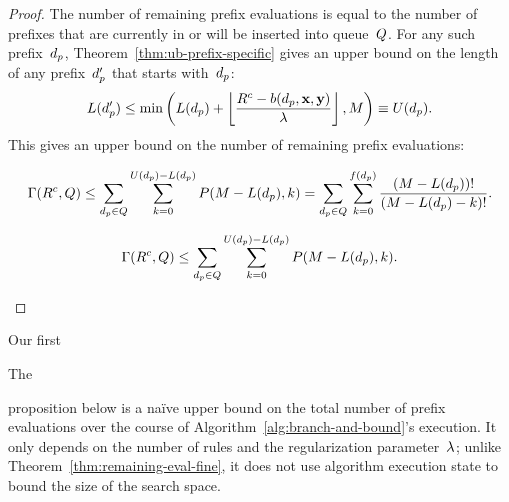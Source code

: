 \begin{proof}
The number of remaining prefix evaluations is equal to the number of
prefixes that are currently in or will be inserted into queue~$Q$.
%
For any such prefix~$d_p$, Theorem~\ref{thm:ub-prefix-specific}
gives an upper bound on the length of any prefix~$d_p'$
that starts with~$d_p$:
\begin{align}
L(d_p') \le \min \left( L(d_p) + \left\lfloor \frac{{R^c} - b(d_p, \mathbf{x}, \mathbf{y})}{{\lambda}} \right\rfloor, M \right)
\equiv U(d_p).
\end{align}
This gives an upper bound on the number of remaining prefix evaluations:
\begin{arxiv}
\begin{align}
\Gamma({R^c}, Q)
\le \sum_{d_p \in Q} \sum_{k=0}^{U(d_p) - L(d_p)} P(M - L(d_p), k)
= \sum_{d_p \in Q} \sum_{k=0}^{f(d_p)} \frac{(M - L(d_p))!}{(M - L(d_p) - k)!}.
\end{align}
\end{arxiv}
\begin{kdd}
\begin{align}
\Gamma({R^c}, Q)
\le \sum_{d_p \in Q} \sum_{k=0}^{U(d_p) - L(d_p)} P(M - L(d_p), k).
\end{align}
\end{kdd}
\end{proof}

\begin{arxiv}
Our first
\end{arxiv}
\begin{kdd}
The
\end{kdd}
proposition below is a na\"ive upper bound on
the total number of prefix evaluations over the course of
Algorithm~\ref{alg:branch-and-bound}'s execution.
%
It only depends on the number of rules and
the regularization parameter~${\lambda}$;
\ie unlike Theorem~\ref{thm:remaining-eval-fine},
it does not use algorithm execution state to
bound the size of the search space.

